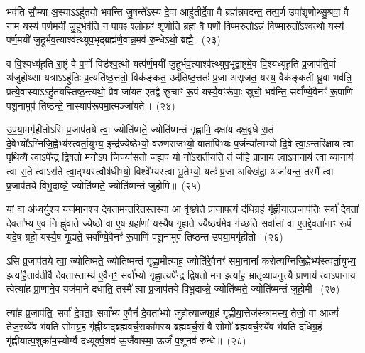 भव॑ति सौ॒म्या अ॒स्या\-ऽऽ\-हु॑तयो भवन्ति जु॒षन्ते᳚\-ऽस्य दे॒वा आहु॑तीर्दे॒वा वै ब्रह्म॑न्नवदन्त॒ तत्प॒र्ण उपा॑शृणोथ्सु॒श्रवा॒ वै नाम॒ यस्य॑ पर्ण॒मयी॑ जु॒हूर्भव॑ति॒ न पा॒पꣴ श्लोकꣳ॑ शृणोति॒ ब्रह्म॒ वै प॒र्णो विण्म॒रुतो\-ऽन्नं॒ विण्मा॑रु॒तो᳚\-ऽश्व॒त्थो यस्य॑ पर्ण॒मयी॑ जु॒हूर्भव॒त्याश्व॑त्थ्युप॒भृद्ब्रह्म॑णै॒वान्न॒मव॑ रु॒न्धे\-ऽथो॒ ब्रह्मै॒-~(२३)\ip

व वि॒श्यध्यू॑हति रा॒ष्ट्रं वै प॒र्णो विड॑श्व॒त्थो यत्प॑र्ण॒मयी॑ जु॒हूर्भव॒त्याश्व॑त्थ्युप॒भृद्रा॒ष्ट्रमे॒व वि॒श्यध्यू॑हति प्र॒जा\-प॑ति॒र्वा अ॑जुहो॒थ्सा यत्रा\-ऽऽ\-हु॑तिः प्र॒त्यति॑ष्ठ॒त्ततो॒ विक॑ङ्कत॒ उद॑तिष्ठ॒त्ततः॑ प्र॒जा अ॑सृजत॒ यस्य॒ वैक॑ङ्कती ध्रु॒वा भव॑ति॒ प्रत्ये॒वास्या\-ऽऽ\-हु॑तयस्तिष्ठ॒न्त्यथो॒ प्रैव जा॑यत ए॒तद्वै स्रु॒चाꣳ रू॒पं यस्यै॒वꣳरू॑पाः॒ स्रुचो॒ भव॑न्ति॒ सर्वा᳚ण्ये॒वैनꣳ॑ रू॒पाणि॑ पशू॒नामुप॑ तिष्ठन्ते॒ नास्याप॑रूपमा॒त्मञ्जा॑यते॥~(२४)\ip

{\anuvakamend[{जु॒हूरथो॒ ब्रह्म॑ स्रु॒चाꣳ स॒प्तद॑श च}]}

उ॒प॒या॒मगृ॑हीतो\-ऽसि प्र॒जा\-प॑तये त्वा॒ ज्योति॑ष्मते॒ ज्योति॑ष्मन्तं गृह्णामि॒ दक्षा॑य दक्ष॒वृधे॑ रा॒तं दे॒वेभ्यो᳚\-ऽग्निजि॒ह्वेभ्य॑\-स्त्वर्ता॒युभ्य॒ इन्द्र॑ज्येष्ठेभ्यो॒ वरु॑णराजभ्यो॒ वाता॑पिभ्यः प॒र्जन्या᳚त्मभ्यो दि॒वे त्वा॒ऽन्तरि॑क्षाय त्वा पृथि॒व्यै त्वा\-ऽपे᳚न्द्र द्विष॒तो मनो\-ऽप॒ जिज्या॑सतो ज॒ह्यप॒ यो नो॑\-ऽराती॒यति॒ तं ज॑हि प्रा॒णाय॑ त्वा\-ऽपा॒नाय॑ त्वा व्या॒नाय॑ त्वा स॒ते त्वा\-ऽस॑ते त्वा॒द्भ्यस्त्वौष॑धीभ्यो॒ विश्वे᳚भ्यस्त्वा भू॒तेभ्यो॒ यतः॑ प्र॒जा अक्खि॑द्रा॒ अजा॑यन्त॒ तस्मै᳚ त्वा प्र॒जा\-प॑तये विभू॒दाव्न्ने॒ ज्योति॑ष्मते॒ ज्योति॑ष्मन्तं जुहोमि॥~(२५)\ip

{\anuvakamend[{ओष॑धीभ्य॒श्चतु॑र्दश च}]}

यां वा अ॑ध्व॒र्युश्च॒ यज॑मानश्च दे॒वता॑मन्तरि॒तस्तस्या॒ आ वृ॑श्च्येते प्राजाप॒त्यं द॑धिग्र॒हं गृ॑ह्णीयात्प्र॒जा\-प॑तिः॒ सर्वा॑ दे॒वता॑ दे॒वता᳚भ्य ए॒व नि ह्नु॑वाते ज्ये॒ष्ठो वा ए॒ष ग्रहा॑णां॒ यस्यै॒ष गृ॒ह्यते॒ ज्यैष्ठ्य॑मे॒व ग॑च्छति॒ सर्वा॑सां॒ वा ए॒तद्दे॒वता॑नाꣳ रू॒पं यदे॒ष ग्रहो॒ यस्यै॒ष गृ॒ह्यते॒ सर्वा᳚ण्ये॒वैनꣳ॑ रू॒पाणि॑ पशू॒नामुप॑ तिष्ठन्त उपया॒मगृ॑हीतो-~(२६)\ip

ऽसि प्र॒जा\-प॑तये त्वा॒ ज्योति॑ष्मते॒ ज्योति॑ष्मन्तं गृह्णा॒मीत्या॑ह॒ ज्योति॑रे॒वैनꣳ॑ समा॒नानां᳚ करोत्यग्निजि॒ह्वेभ्य॑स्त्वर्ता॒युभ्य॒ इत्या॑है॒ताव॑ती॒र्वै दे॒वता॒स्ताभ्य॑ ए॒वैन॒ꣳ॒ सर्वा᳚भ्यो गृह्णा॒त्यपे᳚न्द्र द्विष॒तो मन॒ इत्या॑ह॒ भ्रातृ॑व्यापनुत्त्यै प्रा॒णाय॑ त्वाऽपा॒नाय॒ त्वेत्या॑ह प्रा॒णाने॒व यज॑माने दधाति॒ तस्मै᳚ त्वा प्र॒जा\-प॑तये विभू॒दाव्न्ने॒ ज्योति॑ष्मते॒ ज्योति॑ष्मन्तं जुहो॒मी-~(२७)\ip

त्या॑ह प्र॒जा\-प॑तिः॒ सर्वा॑ दे॒वताः॒ सर्वा᳚भ्य ए॒वैनं॑ दे॒वता᳚भ्यो जुहोत्याज्यग्र॒हं गृ॑ह्णीया॒त्तेज॑स्कामस्य॒ तेजो॒ वा आज्यं॑ तेज॒स्व्ये॑व भ॑वति सोमग्र॒हं गृ॑ह्णीयाद्ब्रह्मवर्च॒सका॑मस्य ब्रह्मवर्च॒सं वै सोमो᳚ ब्रह्मवर्च॒स्ये॑व भ॑वति दधिग्र॒हं गृ॑ह्णीयात्प॒शुका॑म॒स्योर्ग्वै दध्यूर्क्प॒शव॑ ऊ॒र्जैवास्मा॒ ऊर्जं॑ प॒शूनव॑ रुन्धे॥~(२८)\ip


